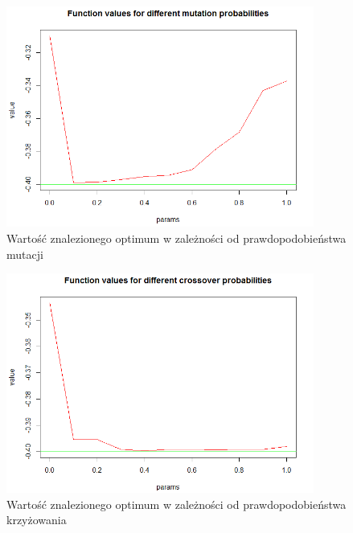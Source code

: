 \documentclass[11pt, a4paper]{article}
\begin{document}
\begin{figure}[H]
	\begin{center}
		\includegraphics[width=0.9\textwidth]{./assets/CosMix42.png} %
		\caption{Wartość znalezionego optimum w zależności od prawdopodobieństwa mutacji}
		\label{fig:cosmix42}
	\end{center}
\end{figure}

\begin{figure}[H]
	\begin{center}
		\includegraphics[width=0.9\textwidth]{./assets/CosMix43.png} %
		\caption{Wartość znalezionego optimum w zależności od prawdopodobieństwa krzyżowania}
		\label{fig:cosmix43}
	\end{center}
\end{figure}
\end{document}

